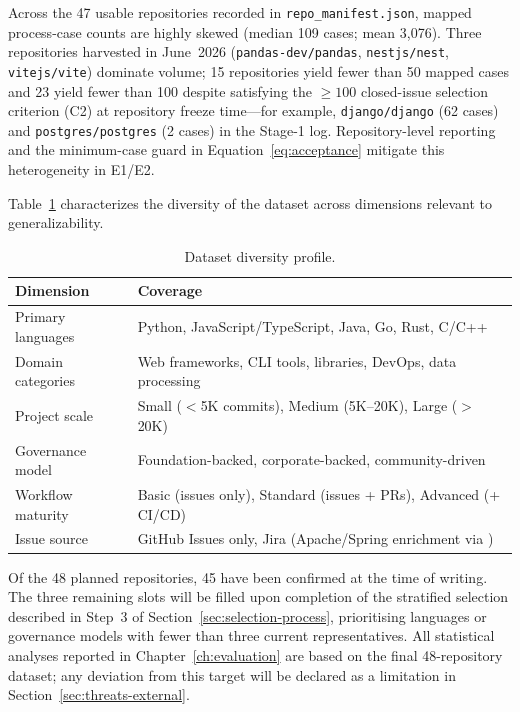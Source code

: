 

Across the 47 usable repositories recorded in \texttt{repo\_manifest.json},
mapped process-case counts are highly skewed (median 109 cases; mean
3{,}076). Three repositories harvested in June~2026
(\texttt{pandas-dev/pandas}, \texttt{nestjs/nest}, \texttt{vitejs/vite})
dominate volume; 15 repositories yield fewer than 50 mapped cases and 23
yield fewer than 100 despite satisfying the $\geq 100$ closed-issue
selection criterion (C2) at repository freeze time---for example,
\texttt{django/django} (62 cases) and \texttt{postgres/postgres} (2 cases)
in the Stage-1 log. Repository-level reporting and the minimum-case guard in
Equation~\eqref{eq:acceptance} mitigate this heterogeneity in E1/E2.

Table~\ref{tab:dataset-diversity} characterizes the diversity of the 
dataset across dimensions relevant to generalizability.

\begin{table}[htbp]
\centering
\caption{Dataset diversity profile.}
\label{tab:dataset-diversity}
\begin{tabular}{ll}
\toprule
\textbf{Dimension} & \textbf{Coverage} \\
\midrule
Primary languages & Python, JavaScript/TypeScript, Java, Go, Rust, C/C++ \\
Domain categories & Web frameworks, CLI tools, libraries, DevOps, data processing \\
Project scale & Small ($<$5K commits), Medium (5K--20K), Large ($>$20K) \\
Governance model & Foundation-backed, corporate-backed, community-driven \\
Workflow maturity & Basic (issues only), Standard (issues + PRs), Advanced (+ CI/CD) \\
Issue source       & \parbox[t]{7.5cm}{GitHub Issues only, Jira
                     (Apache/Spring enrichment via
                     \cite{montgomery2022jira})} \\
\bottomrule
\end{tabular}
\end{table}

Of the 48 planned repositories, 45 have been confirmed at the time of
writing. The three remaining slots will be filled upon completion of the
stratified selection described in Step~3 of
Section~\ref{sec:selection-process}, prioritising languages or governance
models with fewer than three current representatives. All statistical
analyses reported in Chapter~\ref{ch:evaluation} are based on the final
48-repository dataset; any deviation from this target will be declared
as a limitation in Section~\ref{sec:threats-external}.

